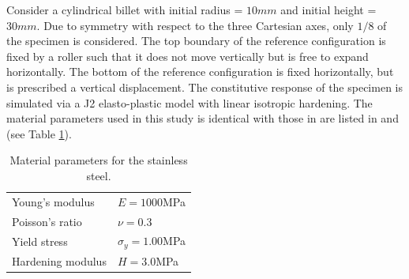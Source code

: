 \documentclass[12pt]{article}
\begin{document}
Consider a cylindrical billet with initial radius = $10mm$ and initial
height = $30mm$. Due to symmetry with respect to the three Cartesian
axes, only $1/8$ of the specimen is considered. The top boundary of
the reference configuration is fixed by a roller such that it does not
move vertically but is free to expand horizontally. The bottom of the
reference configuration is fixed horizontally, but is prescribed a
vertical displacement.  The constitutive response of the specimen is
simulated via a J2 elasto-plastic model with linear isotropic
hardening. The material parameters used in this study is identical
with those in are listed in \citep{Taylor.Becker:1983} and
\citep{Simo.Hughes:1998} (see Table \ref{tab:UpsetBillet}).
\begin{table}[htbp]
  \begin{center}
    \begin{tabular}{ l l }
      \toprule
      
      Young's modulus
      &
      $E = 1000$MPa
      \\
      Poisson's ratio
      &
      $\nu = 0.3$
      \\
      Yield stress  
      &
      $\sigma_{y} = 1.00$MPa
      \\
      Hardening modulus   
      &
      $H=3.0$MPa
      \\
      \bottomrule
    \end{tabular}
    \caption{Material parameters for the stainless steel.}
    \label{tab:UpsetBillet}
  \end{center}
\end{table}
\end{document}
